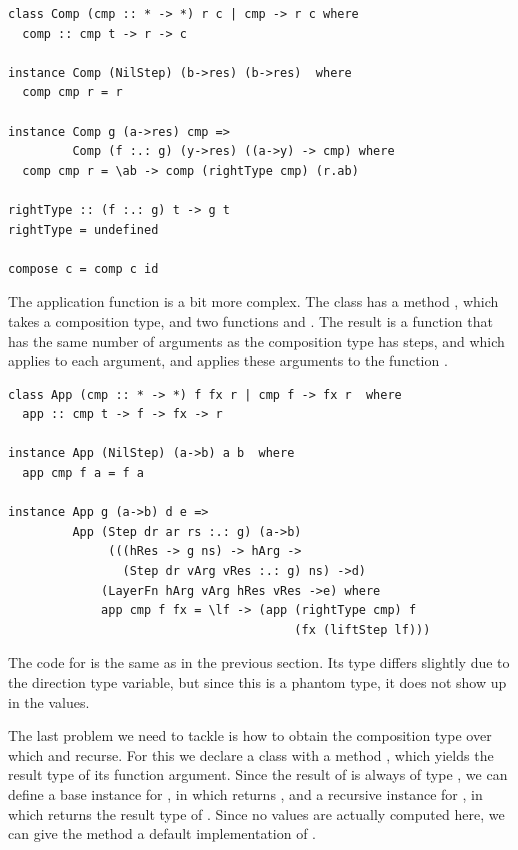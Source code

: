 \documentclass[preprint,natbib]{sigplanconf}
\begin{document}
\begin{small}
\begin{verbatim}
class Comp (cmp :: * -> *) r c | cmp -> r c where
  comp :: cmp t -> r -> c

instance Comp (NilStep) (b->res) (b->res)  where
  comp cmp r = r  

instance Comp g (a->res) cmp =>
         Comp (f :.: g) (y->res) ((a->y) -> cmp) where
  comp cmp r = \ab -> comp (rightType cmp) (r.ab)

rightType :: (f :.: g) t -> g t
rightType = undefined

compose c = comp c id
\end{verbatim}
\end{small}

The application function is a bit more complex. The class  has a method , which takes a composition type, and two functions  and . The result is a function that has the same number of arguments as the composition type has steps, and which applies  to each argument, and applies these arguments to the function .

\begin{small}
\begin{verbatim}
class App (cmp :: * -> *) f fx r | cmp f -> fx r  where
  app :: cmp t -> f -> fx -> r

instance App (NilStep) (a->b) a b  where
  app cmp f a = f a

instance App g (a->b) d e =>
         App (Step dr ar rs :.: g) (a->b) 
              (((hRes -> g ns) -> hArg -> 
                (Step dr vArg vRes :.: g) ns) ->d) 
             (LayerFn hArg vArg hRes vRes ->e) where
             app cmp f fx = \lf -> (app (rightType cmp) f
                                        (fx (liftStep lf))) 
\end{verbatim}
\end{small}

The code for  is the same as in the previous section. Its type differs slightly due to the direction type variable, but since this is a phantom type, it does not show up in the values. 

The last problem we need to tackle is how to obtain the composition type over which  and  recurse. For this we declare a class  with a method , which yields the result type of its function argument. Since the result of  is always of type , we can define a base instance for , in which  returns , and a recursive instance for , in which  returns the result type of . Since no values are actually computed here, we can give the method a default implementation of .
\end{document}
